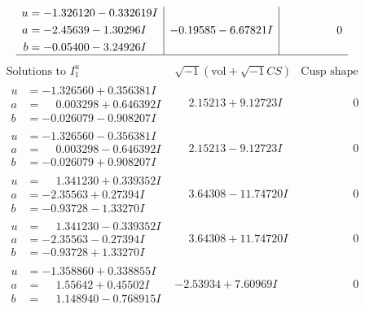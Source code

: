 \documentclass[1p]{elsarticle_modified}
\theoremstyle{definition}
\newcommand{\I}{\sqrt{-1}}
\begin{document}
$$\begin{array}{c|c|c}
\begin{aligned}
u &= -1.326120 - 0.332619 I \\
a &= -2.45639 - 1.30296 I \\
b &= -0.05400 - 3.24926 I\end{aligned}
 & -0.19585 - 6.67821 I & \phantom{-0.000000 } 0\\
 \hline 
 \end{array}$$\newpage$$\begin{array}{c|c|c}  
\text{Solutions to }I^u_{1}& \I (\text{vol} + \sqrt{-1}CS) & \text{Cusp shape}\\
 \hline 
\begin{aligned}
u &= -1.326560 + 0.356381 I \\
a &= \phantom{-}0.003298 + 0.646392 I \\
b &= -0.026079 - 0.908207 I\end{aligned}
 & \phantom{-}2.15213 + 9.12723 I & \phantom{-0.000000 } 0 \\ \hline\begin{aligned}
u &= -1.326560 - 0.356381 I \\
a &= \phantom{-}0.003298 - 0.646392 I \\
b &= -0.026079 + 0.908207 I\end{aligned}
 & \phantom{-}2.15213 - 9.12723 I & \phantom{-0.000000 } 0 \\ \hline\begin{aligned}
u &= \phantom{-}1.341230 + 0.339352 I \\
a &= -2.35563 + 0.27394 I \\
b &= -0.93728 - 1.33270 I\end{aligned}
 & \phantom{-}3.64308 - 11.74720 I & \phantom{-0.000000 } 0 \\ \hline\begin{aligned}
u &= \phantom{-}1.341230 - 0.339352 I \\
a &= -2.35563 - 0.27394 I \\
b &= -0.93728 + 1.33270 I\end{aligned}
 & \phantom{-}3.64308 + 11.74720 I & \phantom{-0.000000 } 0 \\ \hline\begin{aligned}
u &= -1.358860 + 0.338855 I \\
a &= \phantom{-}1.55642 + 0.45502 I \\
b &= \phantom{-}1.148940 - 0.768915 I\end{aligned}
 & -2.53934 + 7.60969 I & \phantom{-0.000000 } 0 \\ \hline\begin{aligned}

\end{aligned}
\end{array}$$
\end{document}
